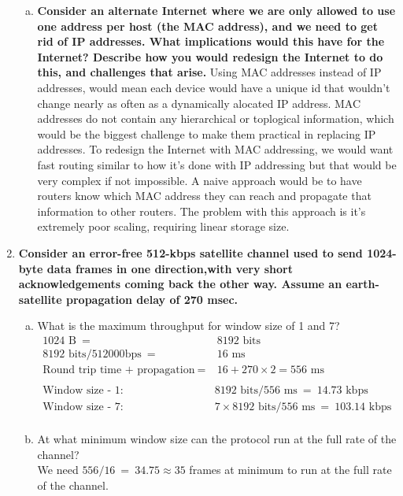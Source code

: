 \documentclass[11pt]{article}
\begin{document}
\begin{enumerate}[1.]
\begin{enumerate}[(a)]
  \item 
  \textbf{
    Consider an alternate Internet where we are only allowed to use one address per host (the MAC address), and we need to get rid of IP addresses. What implications would this have for the Internet? Describe how you would redesign the Internet to do this, and challenges that arise. 
  } 
    Using MAC addresses instead of IP addresses, would mean each device would have a unique id that wouldn't change nearly as often as a dynamically alocated IP address. MAC addresses do not contain any hierarchical or toplogical information, which would be the biggest challenge to make them practical in replacing IP addresses. To redesign the Internet with MAC addressing, we would want fast routing similar to how it's done with IP addressing but that would be very complex if not impossible. A naive approach would be to have routers know which MAC address they can reach and propagate that information to other routers. The problem with this approach is it's extremely poor scaling, requiring linear storage size.
  \end{enumerate}
  \newpage

  \item %
    \textbf{
      Consider an error-free 512-kbps satellite channel used to send 1024-byte data frames in one direction,with very short acknowledgements coming back the other way. Assume an earth-satellite propagation delay of 270 msec. 
    }
    \begin{enumerate}[a.] 
    \item What is the maximum throughput for window size of 1 and 7?
      \begin{align*}
        1024\text{ B}\ =&\ 8192\text{ bits} \\
        8192\text{ bits} / 512000\text{bps}\ =&\ 16\text{ ms} \\
        \text{Round trip time + propagation}\ =&\ 16 + 270 \times 2 = 556\text{ ms} \\ \\
        \text{Window size - 1: }& 8192\text{ bits} / 556\text{ ms}\ =\ 14.73\text{ kbps} \\
        \text{Window size - 7: }& 7 \times 8192\text{ bits} / 556\text{ ms}\ =\ 103.14\text{ kbps} \\
      \end{align*}
    \item At what minimum window size can the protocol run at the full rate of the channel? \\
      We need $556/16 \ =\ 34.75 \approx 35$ frames at minimum to run at the full rate of the channel.  
    \end{enumerate}


\end{enumerate}
\end{document}
